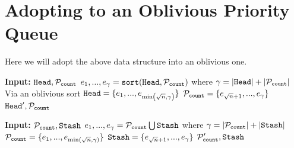 \section{Adopting to an Oblivious Priority Queue}
Here we will adopt the above data structure into an oblivious one.

\newcommand{\DIPQOperation}{\texttt{Operation}}

\begin{algorithm}
	\caption{$\MergeFill$}
	\begin{algorithmic}[1]
			\State \textbf{Input:} $\texttt{Head}, \mathcal{P}_{\texttt{count}}$
			\State $e_1, ..., e_\gamma = \texttt{sort}(\texttt{Head}, \mathcal{P}_{\texttt{count}})$ where $\gamma = |\texttt{Head}| + |\mathcal{P}_{\texttt{count}}|$ \Comment Via an oblivious sort
			\State $\texttt{Head} = \{e_1, ..., e_{\min\left({\sqrt{n}}, \gamma\right)}\}$
			\State $\mathcal{P}_{\texttt{count}} = \{e_{{\sqrt{n}} + 1}, ..., e_\gamma\}$
			\State \Return $\texttt{Head}', \mathcal{P}_{\texttt{count}}$
	\end{algorithmic}
\end{algorithm}

\begin{algorithm}
	\caption{$\Fill$}
	\begin{algorithmic}[1]
			\State \textbf{Input:} $\mathcal{P}_{\texttt{count}}, \texttt{Stash}$
			\State $e_1, ..., e_\gamma = \mathcal{P}_{\texttt{count}} \bigcup \texttt{Stash}$ where $\gamma = |\mathcal{P}_{\texttt{count}}| + |\texttt{Stash}|$
			\State $\mathcal{P}_{\texttt{count}} = \{e_1, ..., e_{\min({\sqrt{n}}, \gamma)}\}$
			\State $\texttt{Stash} = \{e_{{\sqrt{n}} + 1}, ..., e_\gamma\}$
			\State \Return $\mathcal{P}_{\texttt{count}}', \texttt{Stash}$
	\end{algorithmic}
\end{algorithm}


